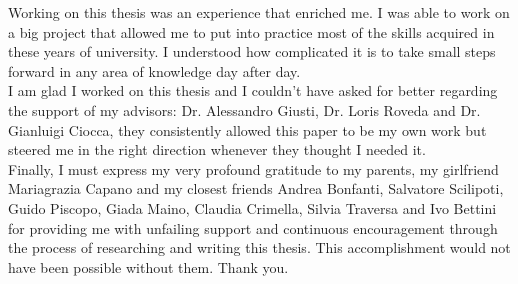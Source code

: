  
Working on this thesis was an experience that enriched me. I was able to work on a big project that allowed me to put into practice most of the skills acquired in these years of university. I understood how complicated it is to take small steps forward in any area of knowledge day after day. \\

\noindent I am glad I worked on this thesis and I couldn't have asked for better regarding the support of my advisors: Dr. Alessandro Giusti, Dr. Loris Roveda and Dr. Gianluigi Ciocca, they consistently allowed this paper to be my own work but steered me in the right direction whenever they thought I needed it. \\

\noindent Finally, I must express my very profound gratitude to my parents, my girlfriend Mariagrazia Capano and my closest friends Andrea Bonfanti, Salvatore Scilipoti, Guido Piscopo, Giada Maino, Claudia Crimella, Silvia Traversa and Ivo Bettini for providing me with unfailing support and continuous encouragement through the process of researching and writing this thesis. This accomplishment would not have been possible without them. Thank you.